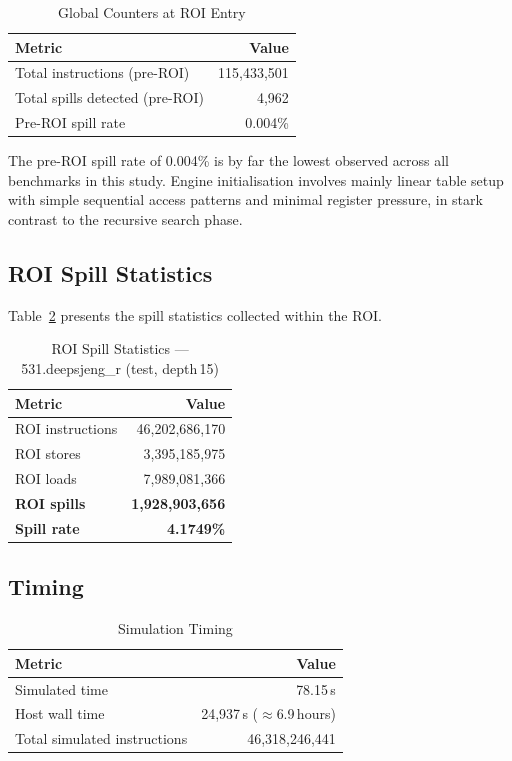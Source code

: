 \documentclass[conference]{IEEEtran}
\begin{document}
\begin{table}[H]
\centering
\caption{Global Counters at ROI Entry}
\label{tab:preroi}
\begin{tabular}{lr}
\toprule
\textbf{Metric} & \textbf{Value} \\
\midrule
Total instructions (pre-ROI) & 115,433,501 \\
Total spills detected (pre-ROI) & 4,962 \\
Pre-ROI spill rate & 0.004\% \\
\bottomrule
\end{tabular}
\end{table}

The pre-ROI spill rate of 0.004\% is by far the lowest observed across
all benchmarks in this study. Engine initialisation involves mainly
linear table setup with simple sequential access patterns and minimal
register pressure, in stark contrast to the recursive search phase.

\subsection{ROI Spill Statistics}

Table~\ref{tab:roi} presents the spill statistics collected within
the ROI.

\begin{table}[H]
\centering
\caption{ROI Spill Statistics --- 531.deepsjeng\_r (test, depth\,15)}
\label{tab:roi}
\begin{tabular}{lr}
\toprule
\textbf{Metric} & \textbf{Value} \\
\midrule
ROI instructions         & 46,202,686,170 \\
ROI stores               &  3,395,185,975 \\
ROI loads                &  7,989,081,366 \\
\midrule
\textbf{ROI spills}      & \textbf{1,928,903,656} \\
\textbf{Spill rate}      & \textbf{4.1749\%} \\
\bottomrule
\end{tabular}
\end{table}

\subsection{Timing}

\begin{table}[H]
\centering
\caption{Simulation Timing}
\label{tab:timing}
\begin{tabular}{lr}
\toprule
\textbf{Metric} & \textbf{Value} \\
\midrule
Simulated time           & 78.15\,s \\
Host wall time           & 24{,}937\,s ($\approx$6.9\,hours) \\
Total simulated instructions & 46,318,246,441 \\
\bottomrule
\end{tabular}
\end{table}
\end{document}
